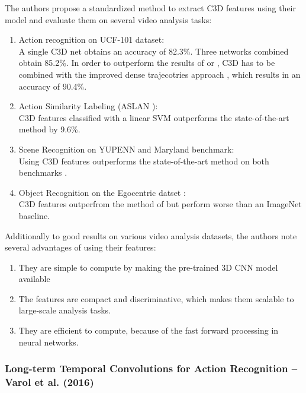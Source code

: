 The authors propose a standardized method to extract C3D features using their model and evaluate them on several video analysis tasks:
\begin{enumerate}
    \item Action recognition on UCF-101 dataset: \\
    A single C3D net obtains an accuracy of 82.3\%.
    Three networks combined obtain 85.2\%.
    In order to outperform the results of \textcite{simonyan_two-stream_2014} or \textcite{ng_beyond_2015}, C3D has to be combined with the improved dense trajecotries approach \cite{wang_action_2013}, which results in an accuracy of 90.4\%.

    \item Action Similarity Labeling (ASLAN \cite{kliper-gross_action_2012}): \\
    C3D features classified with a linear SVM outperforms the state-of-the-art method \cite{peng_large_2014} by 9.6\%.

    \item Scene Recognition on YUPENN and Maryland benchmark: \\
    Using C3D features outperforms the state-of-the-art method on both benchmarks \cite{feichtenhofer_bags_2014}.

    \item Object Recognition on the Egocentric datset \cite{ren_egocentric_2009}: \\
    C3D features outperfrom the method of \cite{ren_egocentric_2009} but perform worse than an ImageNet baseline.
\end{enumerate}

Additionally to good results on various video analysis datasets, the authors note several advantages of using their features:
\begin{enumerate}
    \item They are simple to compute by making the pre-trained 3D CNN model available
    \item The features are compact and discriminative, which makes them scalable to large-scale analysis tasks.
    \item They are efficient to compute, because of the fast forward processing in neural networks.
\end{enumerate}


\subsubsection{Long-term Temporal Convolutions for Action Recognition -- Varol et al. (2016)}

